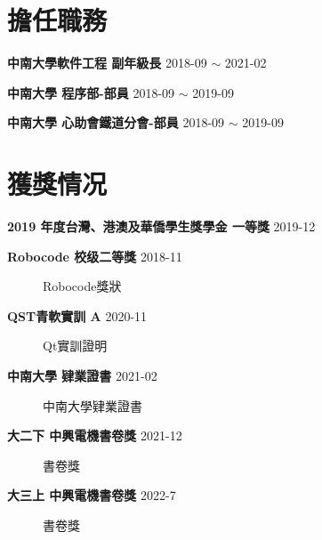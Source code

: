 \documentclass[classical]{einfart}
\begin{document}
\section{擔任職務}

\textbf{中南大學軟件工程 \quad 副年級長} \hfill 2018-09 $\sim$ 2021-02

\textbf{中南大學 \quad 程序部-部員} \hfill 2018-09 $\sim$ 2019-09

\textbf{中南大學 \quad 心助會鐵道分會-部員} \hfill 2018-09 $\sim$ 2019-09
\section{獲獎情况}

\textbf{2019 年度台灣、港澳及華僑學生獎學金 \quad 一等獎} \hfill 2019-12

\textbf{Robocode \quad 校级二等獎} \hfill 2018-11
\begin{figure}[H]
  \centering  %
  \caption{Robocode獎狀}
  \label{Fig.main}
\end{figure}



\textbf{QST青軟實訓 \quad A} \hfill  2020-11
\begin{figure}[H]
  \centering  %
    \caption{Qt實訓證明}
    \label{Fig.main}
  \end{figure}
  
  
  \textbf{中南大學 \quad 肄業證書} \hfill 2021-02
  \begin{figure}[H]
    \centering  %
  \caption{中南大學肄業證書}
  \label{Fig.main}
\end{figure}

\textbf{大二下 \quad 中興電機書卷獎} \hfill 2021-12
\begin{figure}[H]
  \centering  %
  \caption{書卷獎}
  \label{Fig.main}
\end{figure}

\textbf{大三上 \quad 中興電機書卷獎} \hfill 2022-7

\begin{figure}[H]
  \centering  %
  \caption{書卷獎}
  \label{Fig.main}
\end{figure}
\end{document}
